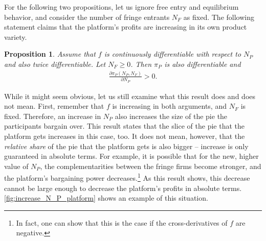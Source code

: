 \documentclass[a4paper]{article}
\newtheorem{proposition}{Proposition}
\begin{document}
For the following two propositions, let us ignore free entry and equilibrium behavior, and consider the number of fringe entrants $N_F$ as fixed.
The following statement claims that the platform's profits are increasing in its own product variety.
\begin{proposition}
    \label{prop:share_of_platform}
    Assume that $f$ is continuously differentiable with respect to $N_P$ and also twice differentiable.
    Let $N_F \geq 0$.
    Then $\pi_P$ is also differentiable and
    \begin{align*}
        \frac{\partial \pi_P(N_P, N_F)}{\partial N_P} > 0.
    \end{align*}
\end{proposition}
While it might seem obvious, let us still examine what this result does and does not mean.
First, remember that $f$ is increasing in both arguments, and $N_F$ is fixed.
Therefore, an increase in $N_P$ also increases the size of the pie the participants bargain over.
This result states that the slice of the pie that the platform gets increases in this case, too.
It does not mean, however, that the \emph{relative share} of the pie that the platform gets is also bigger -- increase is only guaranteed in absolute terms.
For example, it is possible that for the new, higher value of $N_P$, the complementarities between the fringe firms become stronger, and the platform's bargaining power decreases.\footnote{
    In fact, one can show that this is the case if the cross-derivatives of $f$ are negative.
}
As this result shows, this decrease cannot be large enough to decrease the platform's profits in absolute terms.
\cref{fig:increase_N_P_platform} shows an example of this situation.
\end{document}
